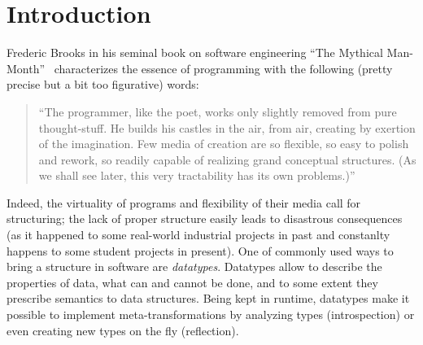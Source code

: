 \section{Introduction}

Frederic Brooks in his seminal book on software engineering ``The Mythical Man-Month''~\cite{MMM} characterizes the essence of programming with the following (pretty precise
but a bit too figurative) words:

\blockquote{``The programmer, like the poet, works only slightly removed from pure thought-stuff. He builds his castles in the air, from air, creating by exertion of the imagination. Few media of
creation are so flexible, so easy to polish and rework, so readily capable of realizing grand conceptual structures. (As we shall see later, this very tractability has its own problems.)''}

Indeed, the virtuality of programs and flexibility of their media call for structuring; the lack of proper structure easily leads to disastrous consequences
(as it happened to some real-world industrial projects in past and constanlty happens to some student projects in present). One of commonly used ways to bring a
structure in software are \emph{datatypes}. Datatypes allow to describe the properties of data, what can and cannot be done, and to some extent they prescribe
semantics to data structures. Being kept in runtime, datatypes make it possible to implement meta-transformations by analyzing types (introspection)
or even creating new types on the fly (reflection).

